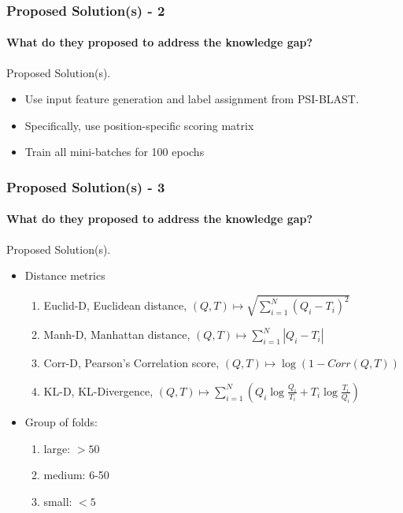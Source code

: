 \documentclass[xcolor={usenames,dvipsnames},hyperref={hyperindex,bookmarks}]{beamer}
\begin{document}
\frame
{
	\frametitle{Proposed Solution(s) - 2}
	\framesubtitle{What do they proposed to address the knowledge gap?}

	Proposed Solution(s).
	\begin{itemize}
	\item Use input feature generation and label assignment from PSI-BLAST.
	\item Specifically, use position-specific scoring matrix
	\item Train all mini-batches for 100 epochs
	\end{itemize}
}



\frame
{
	\frametitle{Proposed Solution(s) - 3}
	\framesubtitle{What do they proposed to address the knowledge gap?}

	Proposed Solution(s).
	\begin{itemize}
	\item Distance metrics
		\begin{enumerate} 
		\item Euclid-D, Euclidean distance, $(Q, T) \mapsto \sqrt{\displaystyle\sum_{i = 1}^{N} (Q_{i} - T_{i})^{2}}$
		\item Manh-D, Manhattan distance, $(Q, T) \mapsto \displaystyle\sum_{i = 1}^{N} |Q_{i} - T_{i}|$
		\item Corr-D, Pearson's Correlation score, $(Q, T) \mapsto \log{(1 - Corr(Q, T))}$
		\item KL-D, KL-Divergence, $(Q, T) \mapsto \displaystyle\sum_{i = 1}^{N} (Q_{i}\log{\frac{Q_{i}}{T_{i}} + T_{i}\log\frac{T_{i}}{Q_{i}}})$
		\end{enumerate}
	\item Group of folds:
		\begin{enumerate} 
		\item large: $>50$
		\item medium: 6-50
		\item small: $<5$
		\end{enumerate}
	\end{itemize}
}
\end{document}
